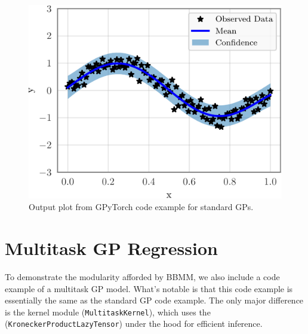 \longcodefalse

\begin{figure}[h!]
  \centering
  \includegraphics[width=0.5\linewidth]{figures/example_gpytorch_plot.pdf}
  \caption{
    Output plot from GPyTorch code example for standard GPs.
  }
  \label{fig:example_gpytorch_plot}
\end{figure}







\section{Multitask GP Regression}
\label{app:multitask_gp_example}

To demonstrate the modularity afforded by BBMM, we also include a code example of a multitask GP model.
What's notable is that this code example is essentially the same as the standard GP code example.
The only major difference is the kernel module ({\tt MultitaskKernel}),
which uses the ({\tt KroneckerProductLazyTensor}) under the hood for efficient inference.

